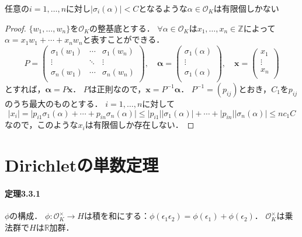 \begin{screen}
  \begin{lem}
    \label{place_restricted_is_finite}
    任意の$i=1,\ldots,n$に対し$\lvert\sigma_i(\alpha)\rvert< C$となるような$\alpha\in\mathcal{O}_K$は有限個しかない
  \end{lem}
\end{screen}
\begin{proof}
  $\{w_1,\ldots,w_n\}$を$\mathcal{O}_K$の整基底とする．
  $\forall\alpha\in\mathcal{O}_K$は$x_1,\ldots,x_n\in\mathbb{Z}$によって$\alpha=x_1w_1+\cdots+x_nw_n$と表すことができる．
  \[P=
  \begin{pmatrix}
    \sigma_1(w_1) & \cdots & \sigma_1(w_n)\\
    \vdots & \ddots & \vdots \\
    \sigma_n(w_1) & \cdots & \sigma_n(w_n)\\
  \end{pmatrix}
  ,\quad\boldsymbol\alpha=
  \begin{pmatrix}
    \sigma_1(\alpha)\\
    \vdots\\
    \sigma_1(\alpha)\\
  \end{pmatrix}
  ,\quad\boldsymbol x=
  \begin{pmatrix}
    x_1\\
    \vdots\\
    x_n\\
  \end{pmatrix}
  \]
  とすれば，$\boldsymbol\alpha=P\boldsymbol x$．
  $P$は正則なので，$\boldsymbol x=P^{-1}\boldsymbol\alpha$．
  $P^{-1}=(p_{ij})$とおき，$C_1$を$p_{ij}$のうち最大のものとする．
  $i=1,\ldots,n$に対して
  \[\lvert x_i\rvert=\lvert p_{i1}\sigma_1(\alpha)+\cdots+p_{in}\sigma_n(\alpha)\rvert\leq\lvert p_{i1}\rvert\lvert\sigma_1(\alpha)\rvert+\cdots+\lvert p_{in}\rvert\lvert\sigma_n(\alpha)\rvert\leq nc_1C\]
  なので，このような$x_i$は有限個しか存在しない．
\end{proof}

\section{Dirichletの単数定理}
\paragraph{定理3.3.1}
\label{II_3_3_1}
$\phi$の構成．
$\phi\colon\mathcal{O}_K^\times\to H$は積を和にする：$\phi(\epsilon_1\epsilon_2)=\phi(\epsilon_1)+\phi(\epsilon_2)$．
$\mathcal{O}_K^\times$は乗法群で$H$は$\mathbb{R}$加群．

